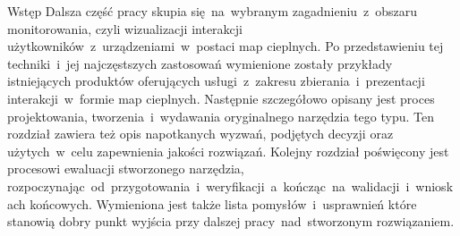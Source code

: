 \begin{chapter}{Wstęp}
	Dalsza część pracy skupia się~na~wybranym zagadnieniu~z~obszaru monitorowania, czyli wizualizacji interakcji użytkowników~z~urządzeniami~w~postaci map cieplnych. Po przedstawieniu tej techniki~i~jej najczęstszych zastosowań wymienione zostały przykłady istniejących produktów oferujących usługi~z~zakresu zbierania~i~prezentacji interakcji~w~formie map cieplnych. Następnie szczegółowo opisany jest proces projektowania, tworzenia~i~wydawania oryginalnego narzędzia tego typu. Ten rozdział zawiera też opis napotkanych wyzwań, podjętych decyzji oraz użytych~w~celu zapewnienia jakości rozwiązań. Kolejny rozdział poświęcony jest procesowi ewaluacji stworzonego narzędzia, rozpoczynając~od~przygotowania~i~weryfikacji~a~kończąc~na~walidacji~i~wnioskach końcowych. Wymieniona jest także lista pomysłów~i~usprawnień które stanowią dobry punkt wyjścia przy dalszej pracy~nad~stworzonym rozwiązaniem.
\end{chapter}
